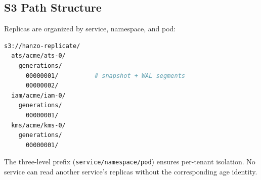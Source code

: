 \subsection{S3 Path Structure}

Replicas are organized by service, namespace, and pod:

\begin{lstlisting}[language=bash,caption={S3 path layout.}]
s3://hanzo-replicate/
  ats/acme/ats-0/
    generations/
      00000001/          # snapshot + WAL segments
      00000002/
  iam/acme/iam-0/
    generations/
      00000001/
  kms/acme/kms-0/
    generations/
      00000001/
\end{lstlisting}

The three-level prefix (\texttt{service/namespace/pod}) ensures per-tenant
isolation. No service can read another service's replicas without the
corresponding age identity.

